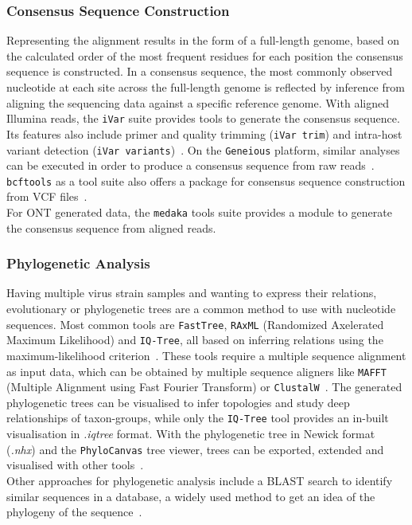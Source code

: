 \subsubsection*{Consensus Sequence Construction}
Representing the alignment results in the form of a full-length genome, based on the calculated order of the most frequent residues for each position the consensus sequence is constructed. In a consensus sequence, the most commonly observed nucleotide at each site across the full-length genome is reflected by inference from aligning the sequencing data against a specific reference genome. With aligned Illumina reads, the \texttt{iVar} suite provides tools to generate the consensus sequence. Its features also include primer and quality trimming (\texttt{iVar trim}) and intra-host variant detection (\texttt{iVar variants})~\cite{grubaugh2019amplicon}. On the \texttt{Geneious} platform, similar analyses can be executed in order to produce a consensus sequence from raw reads~\cite{kearse2012geneious}. \texttt{bcftools} as a tool suite also offers a package for consensus sequence construction from \ac{VCF} files~\cite{li2009sequence}.\\
For \ac{ONT} generated data, the \texttt{medaka} tools suite provides a module to generate the consensus sequence from aligned reads. 

\subsubsection*{Phylogenetic Analysis}
Having multiple virus strain samples and wanting to express their relations, evolutionary or phylogenetic trees are a common method to use with nucleotide sequences. Most common tools are \texttt{FastTree}, \texttt{RAxML} (Randomized Axelerated Maximum Likelihood) and \texttt{IQ-Tree}, all based on inferring relations using the maximum-likelihood criterion~\cite{price2009fasttree, stamatakis2014raxml, minh2020iq}. These tools require a multiple sequence alignment as input data, which can be obtained by multiple sequence aligners like \texttt{MAFFT} (Multiple Alignment using Fast Fourier Transform) or \texttt{ClustalW}~\cite{katoh2013mafft, thompson2003multiple}. The generated phylogenetic trees can be visualised to infer topologies and study deep relationships of taxon-groups, while only the \texttt{IQ-Tree} tool provides an in-built visualisation in \textit{.iqtree} format. With the phylogenetic tree in Newick format (\textit{.nhx}) and the \texttt{PhyloCanvas} tree viewer, trees can be exported, extended and visualised with other tools~\cite{abudahab2021phylocanvas}.\\
Other approaches for phylogenetic analysis include a \ac{BLAST} search to identify similar sequences in a database, a widely used method to get an idea of the phylogeny of the sequence~\cite{altschul1997gapped}.

